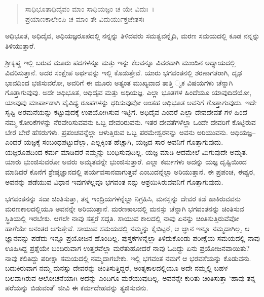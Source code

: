 \begin{verse}
ಸಾಧಿಭೂತಾಧಿದೈವಂ ಮಾಂ ಸಾಧಿಯಜ್ಞಂ ಚ ಯೇ ವಿದುಃ~।\\ಪ್ರಯಾಣಕಾಲೇಽಪಿ ಚ ಮಾಂ ತೇ ವಿದುರ್ಯುಕ್ತಚೇತಸಃ 
\end{verse}

{\small ಅಧಿಭೂತ, ಅಧಿದೈವ, ಅಧಿಯಜ್ಞರೂಪದಲ್ಲಿ ನನ್ನನ್ನು ತಿಳಿದವರು ಸಮತ್ವವನ್ನೈದಿ, ಮರಣ ಸಮಯದಲ್ಲಿ ಕೂಡ ನನ್ನನ್ನು ತಿಳಿಯುತ್ತಾರೆ.}

ಶ‍್ರೀಕೃಷ್ಣ ಇಲ್ಲಿ ಬರುವ ಮೂರು ಪದಗಳನ್ನೂ ಮತ್ತು ಇನ್ನು ಕೆಲವನ್ನೂ ವಿವರವಾಗಿ ಮುಂದಿನ ಅಧ್ಯಾಯದಲ್ಲಿ ವಿವರಿಸುತ್ತಾನೆ. ಅದರ ಸಂಕ್ಷೇಪ ಅರ್ಥವನ್ನು ಇಲ್ಲಿ ಕೊಡುತ್ತೇವೆ. ಯಾರು ಭಗವಂತನಲ್ಲಿ ಶರಣಾಗತರಾಗಿ, ದೃಢ ಭಾವದಿಂದ ಭಜಿಸುವರೋ, ಅವರಿಗೆ ಈ ಮೂರು ಅತ್ಯಂತ ಮುಖ್ಯವಾದ ತಾತ್ತಿ ್ವಕ ವಿಷಯಗಳು ಚೆನ್ನಾಗಿ ಗೊತ್ತಾಗುವುವು. ಅದೇ ಅಧಿಭೂತ, ಅಧಿದೈವ ಮತ್ತು ಅಧಿಯಜ್ಞ. ಎಲ್ಲಾ ಭೂತಗಳ ಹಿಂದೆಯೂ ಯಾವುದಿದೆಯೋ, ಯಾವುವು ಮಾರ್ಪಾಡಾಗಿ ವೈವಿಧ್ಯ ರೂಪಗಳನ್ನು ಧರಿಸುವುವೋ ಅಂತಹ ಅಧಿಭೂತ ಅವನಿಗೆ ಗೊತ್ತಾಗುವುದು. ಇದೇ ಸೃಷ್ಟಿ ಅರಮನೆಯನ್ನು ಕಟ್ಟುವುದಕ್ಕೆ ಉಪಯೋಗಿಸುವ ಇಟ್ಟಿಗೆ. ಅಧಿದೈವ ಎಂದರೆ ಎಲ್ಲಾ ದೇವದೇವತೆ ಗಳ ಹಿಂದೆ ನಮ್ಮ ಕೋರಿಕೆಗಳನ್ನು ನೆರವೇರಿಸುವವನು ಒಬ್ಬ ದೇವರಿರುವನು. ಇತರ ದೇವತೆಗಳೆಲ್ಲಾ ಒಂದೇ ದೇವರಿಗೆ ಕೊಟ್ಟಿರುವ ಬೇರೆ ಬೇರೆ ಹೆಸರುಗಳು. ಪ್ರಪಂಚವನ್ನೆಲ್ಲಾ ಆಳುತ್ತಿರುವ ಒಬ್ಬ ಪರಮೇಶ್ವರನನ್ನು ಅವನು ಅರಿಯುವನು. ಅಧಿಯಜ್ಞ–ಎಂದರೆ ಯಜ್ಞಕ್ಕೆ ಸಂಬಂಧಪಟ್ಟುದೆಲ್ಲಾ, ಎಲ್ಲಕ್ಕಿಂತ ಹೆಚ್ಚಾಗಿ, ಯಜ್ಞದ ಸಾರ ಅವನಿಗೆ ಗೊತ್ತಾಗುವುದು. ಯಜ್ಞರೂಪದಿಂದ ಕರ್ಮ ಮಾಡಿದರೆ ನಮ್ಮನ್ನು ಬಂಧಿಸುವುದಿಲ್ಲ. ಯಜ್ಞ ಮಾಡಿ ಆದಮೇಲೆ ಮಿಗುವುದೇ ಅಮೃತ. ಯಾರು ಭುಂಜಿಸುವರೋ ಅವರು ಅಮೃತವನ್ನೇ ಭುಂಜಿಸುತ್ತಾರೆ. ಎಲ್ಲಾ ಕರ್ಮಗಳು ಅದನ್ನು ಯಜ್ಞ ದೃಷ್ಟಿಯಿಂದ ಮಾಡಿದರೆ ಕೊನೆಗೆ ಶ್ರೇಷ್ಠಜ್ಞಾನದಲ್ಲಿ ಪರ್ಯವಸಾನವಾಗುತ್ತವೆ ಎಂಬುದನ್ನೆಲ್ಲಾ ಅರಿಯುತ್ತಾನೆ. ಈ ಪ್ರಪಂಚ, ಈಶ್ವರ, ಅವನನ್ನು ಪಡೆಯುವ ವಿಧಾನ ಇವುಗಳೆಲ್ಲವೂ ಭಗವಂತ ನನ್ನು ಆಶ್ರಯಿಸಿರುವವನಿಗೆ ಗೊತ್ತಾಗುವುದು.

ಭಗವಂತನನ್ನು ಸದಾ ಚಿಂತಿಸುತ್ತಾ, ತನ್ನ ಇಂದ್ರಿಯಗಳನ್ನೆಲ್ಲಾ ನಿಗ್ರಹಿಸಿ, ಮನಸ್ಸನ್ನು ದೇವರ ಕಡೆ ಹಾಕಿರುವವನು ಮರಣಕಾಲದಲ್ಲಿಯೂ ಅವನನ್ನೇ ಅರಿಯುತ್ತಾನೆ. ಮರಣಕಾಲದಲ್ಲಿ ಮನಸ್ಸು ಚೆನ್ನಾಗಿ ಭಗವಂತನನ್ನು ಚಿಂತಿಸುವ ಸ್ಥಿತಿಯಲ್ಲಿ ಇರಬೇಕು. ಆಗಲೇ ನಾವು ಸತ್ತರೆ ಸದ್ಗತಿ. ಸಾಯುವ ಕಾಲದಲ್ಲಿ ನಾವು ಏನನ್ನು ಚಿಂತಿಸುತ್ತಿರುವೆವೋ ಹಾಗೆಯೇ ಅನಂತರ ಆಗುತ್ತೇವೆ. ಸಾಯುವ ಸಮಯದಲ್ಲಿ ನಮ್ಮನ್ನು ಕೈಬಿಟ್ಟರೆ, ಆ ಜ್ಞಾನ ಇನ್ನೂ ನಮ್ಮದಾಗಿಲ್ಲ, ಆ ಜ್ಞಾನವನ್ನು ಪಡೆದು ಇನ್ನೂ ಪ್ರಯೋಜನ ಹೊಂದಿಲ್ಲ. ಪುಸ್ತಕಗಳನ್ನೆಲ್ಲಾ ತಿಳಿದುಕೊಂಡು ಪರೀಕ್ಷೆಯ ಸಮಯದಲ್ಲಿ ನಾವು ಊಹಿಸಿದ್ದ ಪ್ರಶ್ನೆಯೇ ಬಂದಿರುವಾಗ ಉತ್ತರವೆಲ್ಲಾ ಮರೆತುಹೋದರೆ ನಾವು ಓದಿದ್ದು ಏನು ಪ್ರಯೋಜನವಾಯಿತು? ನಾವು ಕಲಿತಿದ್ದು ಪರೀಕ್ಷಾ ಸಮಯದಲ್ಲಿ ನಮ್ಮದಾಗಬೇಕು. ಇಲ್ಲಿ ಭಗವಂತ ನಮಗೆ ಆ ಭರವಸೆಯನ್ನು ಕೊಡುವನು. ಬದುಕಿರುವಾಗ ನಮ್ಮ ಮನಸ್ಸು ದೇವರನ್ನು ಚಿಂತಿಸುತ್ತಿದ್ದರೆ, ಅಂತ್ಯಕಾಲದಲ್ಲಿಯೂ ಅದೇ ನಮ್ಮಲ್ಲಿ ಬಹಳ ಬಲವಾಗಿರುವ ಆಲೋಚನೆಯಾಗಿ ಅದನ್ನು ಎಂದಿಗೂ ಮರೆಯುವುದಿಲ್ಲ. ಅವನನ್ನೇ ಕುರಿತು ಚಿಂತಿಸುತ್ತಾ ‘ಹಾವು ತನ್ನ ಪರೆಯನ್ನು ಬಿಡುವಂತೆ’ ಜೀವಿ ಈ ಕರ್ಮದೇಹವನ್ನು ತ್ಯಜಿಸುವನು.


